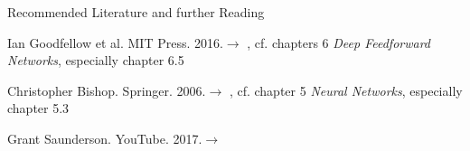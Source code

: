 \begin{frame}{Recommended Literature and further Reading}{}
	\footnotesize
	\begin{thebibliography}{2}
			{Ian Goodfellow et al. MIT Press. 2016.}{$\rightarrow$ \href{
				http://www.deeplearningbook.org/
			}{}, cf. chapters 6 \textit{Deep Feedforward Networks}, especially chapter 6.5}
	
			{Christopher Bishop. Springer. 2006.}{$\rightarrow$ \href{
				http://users.isr.ist.utl.pt/~wurmd/Livros/school/Bishop\%20-\%20Pattern\%20Recognition\%20And\%20Machine\%20Learning\%20-\%20Springer\%20\%202006.pdf
			}{}, cf. chapter 5 \textit{Neural Networks}, especially chapter 5.3}

			{Grant Saunderson. YouTube. 2017.}{$\rightarrow$ \href{
				https://www.youtube.com/watch?v=tIeHLnjs5U8
			}{}}

	\end{thebibliography}
\end{frame}


\makethanks

